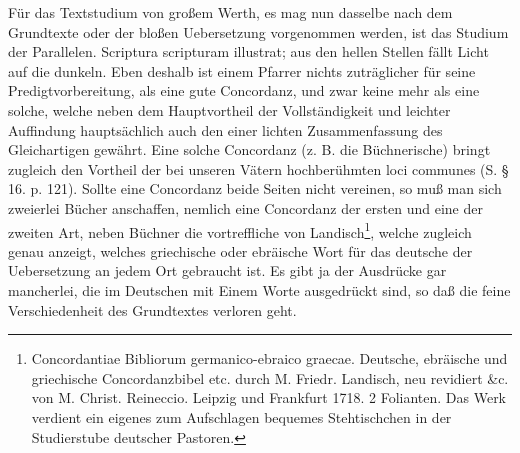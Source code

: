 Für das Textstudium von großem Werth, es mag nun dasselbe nach dem Grundtexte oder der bloßen Uebersetzung vorgenommen werden, ist das Studium der Parallelen. Scriptura scripturam illustrat; aus den hellen Stellen fällt Licht auf die dunkeln. Eben deshalb ist einem Pfarrer nichts zuträglicher für seine Predigtvorbereitung, als eine gute Concordanz, und zwar keine mehr als eine solche, welche neben dem Hauptvortheil der Vollständigkeit und leichter Auffindung hauptsächlich auch den einer lichten Zusammenfassung des Gleichartigen gewährt. Eine solche Concordanz
(z. B. die Büchnerische) bringt zugleich den Vortheil der bei unseren Vätern hochberühmten loci communes (S. § 16. p. 121). Sollte eine Concordanz beide Seiten nicht vereinen, so muß man sich zweierlei Bücher anschaffen, nemlich eine Concordanz der ersten und eine der zweiten Art, neben Büchner die vortreffliche von Landisch\footnote{Concordantiae Bibliorum germanico-ebraico graecae. Deutsche, ebräische und griechische Concordanzbibel etc. durch M. Friedr. Landisch, neu revidiert \&c. von M. Christ. Reineccio. Leipzig und Frankfurt 1718. 2 Folianten. Das Werk verdient ein eigenes zum Aufschlagen bequemes Stehtischchen in der Studierstube deutscher Pastoren.}, welche zugleich genau anzeigt, welches griechische oder ebräische Wort für das deutsche der Uebersetzung an jedem Ort gebraucht ist. Es gibt ja der Ausdrücke gar mancherlei, die im Deutschen mit Einem Worte ausgedrückt sind, so daß die feine Verschiedenheit des Grundtextes verloren geht.

